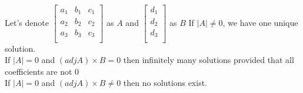 \begin{theorem}
Let's denote $\begin{bmatrix}
    a_1 & b_1 & c_1\\
    a_2 & b_2 & c_2\\
    a_3 & b_3 & c_3\\
\end{bmatrix}$ as $A$ and $\begin{bmatrix}
    d_1\\
    d_2\\
    d_3\\
\end{bmatrix}$ as $B$
    If $|A|\neq 0$, we have one unique solution.\\
    If $|A|=0$ and $(adj A) \times B=0$ then infinitely many solutions provided that all coefficients are not $0$\\
    If $|A|=0$ and $(adj A) \times B \neq 0$ then no solutions exist.
\end{theorem}
